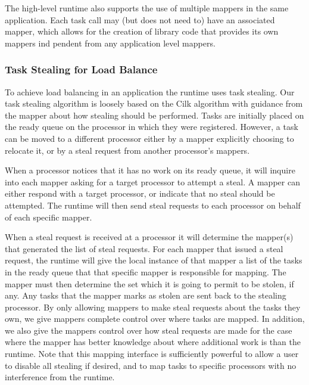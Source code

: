 The high-level runtime also supports the use of multiple mappers in the same application.  Each task 
call may (but does not need to) have an associated mapper,
which allows for the creation of library code that provides its own mappers ind pendent
from any application level mappers.

\subsubsection{Task Stealing for Load Balance}
\label{subsec:steal}
To achieve load balancing in an application the runtime uses
task stealing.  Our task stealing algorithm is loosely based on the Cilk algorithm
\cite{CILK95} with guidance from the mapper about how stealing should be
performed.  Tasks are initially placed on the ready queue on the processor in which they
were registered.  However, a task can be moved to a different processor either by a mapper
explicitly choosing to relocate it, or by a steal request from another processor's mappers.

When a processor notices that it has no work on its ready queue, it will inquire into each
mapper asking for a target processor to attempt a steal.  A mapper can either respond with
a target processor, or indicate that no steal should be attempted.  The runtime will then
send steal requests to each processor on behalf of each specific mapper.  

When a steal request is received at a processor it will determine the mapper(s) that generated
the list of steal requests.  For each mapper that issued a steal request, the runtime will
give the local instance of that mapper a list of the tasks in the ready queue that that
specific mapper is responsible for mapping.  The mapper must then determine the set which
it is going to permit to be stolen, if any.  Any tasks that the mapper marks as stolen are
sent back to the stealing processor.  By only allowing mappers to make steal requests about
the tasks they own, we give mappers complete control over where tasks are mapped.
In addition, we also give the mappers control over how steal requests are made for
the case where the mapper has better knowledge about where additional work is than the 
runtime.  Note that this mapping interface is sufficiently powerful to allow a user to
disable all stealing if desired, and to map tasks to specific processors with no interference
from the runtime.

